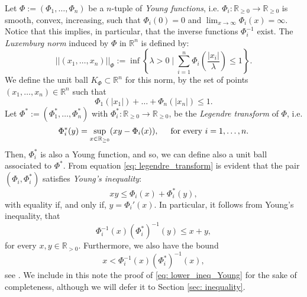 \documentclass{article}
\theoremstyle{definition}
\begin{document}

Let $\Phi:=(\Phi_1,\ldots,\Phi_n)$ be a $n$-tuple of \textit{Young functions}, i.e. $\Phi_i:\mathbb{R}_{\geq 0} \to \mathbb{R}_{\geq 0}$ is smooth, convex, increasing, such that $\Phi_i(0)=0$ and $\lim_{x\to \infty}\Phi_i(x)=\infty$. Notice that this implies, in particular, that the inverse functions $\Phi_i^{-1}$ exist. The \textit{Luxemburg norm} induced by $\Phi$ in $\mathbb{R}^n$ is defined by:
$$||(x_1,\ldots,x_n)||_{\Phi}:=\inf\left\{\lambda>0\mid \sum_{i=1}^{n}\Phi_i\left(\frac{|x_i|}{\lambda}\right)\leq 1\right\}.$$
We define the unit ball $K_{\Phi}\subset\mathbb{R}^n$ for this norm, by the set of points $(x_1,\ldots,x_n)\in \mathbb{R}^n$ such that 
$$\Phi_1(|x_1|)+\ldots+\Phi_n(|x_n|)\leq 1.$$
Let $\Phi^*:=(\Phi^*_1,\ldots,\Phi^*_n)$ with $\Phi^*_i:\mathbb{R}_{\geq 0} \to \mathbb{R}_{\geq 0}$, be the \textit{Legendre transform} of $\Phi$, i.e. 
\begin{equation}\label{eq: legendre_transform}
\Phi^*_i(y)=\sup_{x\in \mathbb{R}_{\geq 0}}(xy-\Phi_i(x)), \hspace{5mm} \textup{for every }i=1,\ldots,n.
\end{equation}
Then, $\Phi_i^*$ is also a Young function, and so, we can define also a unit ball associated to $\Phi^*$. From equation \eqref{eq: legendre_transform} is evident that the pair $(\Phi_i,\Phi_i^*)$ satisfies \textit{Young's inequality}:
\begin{equation}\label{eq: young}
xy\leq \Phi_i(x)+\Phi_i^*(y),
\end{equation}
with equality if, and only if, $y=\Phi_i'(x)$. In particular, it follows from Young's inequality, that 
\begin{equation}\label{eq: young_2}
\Phi_i^{-1}(x)(\Phi_i^*)^{-1}(y)\leq x+y,
\end{equation}
for every $x,y\in \mathbb{R}_{> 0}$. Furthermore, we also have the bound
\begin{equation}\label{eq: lower_ineq_Young}
x<\Phi_i^{-1}(x)(\Phi_i^*)^{-1}(x),
\end{equation}
see \cite[Proposition 2.1]{Rao1991TheoryOO}. We include in this note the proof of \eqref{eq: lower_ineq_Young} for the sake of completeness, although we will defer it to Section \ref{sec: inequality}.
\end{document}
